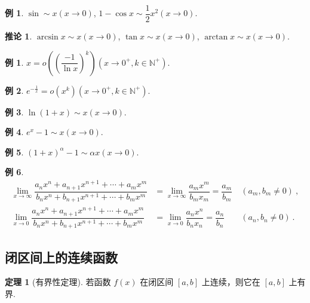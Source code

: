 \documentclass[zihao=-4,linespread=1.8,UTF8,nothm]{aytony_base}
\theoremstyle{definition}
\newtheorem{theorem}{\indent\heiti\textbf{定理}}[subsection]
\newtheorem*{corollary}{\indent\heiti\textbf{推论}}
\newtheorem{example}{\indent\heiti\textbf{例}}[subsection]
\newtheorem*{example*}{\indent\heiti\textbf{例}}
\begin{document}
\begin{example*}
    $\sin \sim x(x \to 0)$, $1 - \cos x \sim \dfrac{1}{2}x^2(x \to 0)$.
\end{example*}

\begin{corollary}
    $\arcsin x \sim x(x \to 0)$, $\tan x \sim x(x \to 0)$, $\arctan x \sim x(x \to 0)$.
\end{corollary}

\begin{example}
    $x = o\left(\left(\dfrac{-1}{\ln x}\right)^k\right)(x \to 0^+, k \in \mathbb{N}^+)$.
\end{example}

\begin{example}
    $e^{-\frac{1}{x}} = o(x^k)(x \to 0^+, k \in \mathbb{N}^+)$.
\end{example}

\begin{example}
    $\ln (1+x) \sim x(x \to 0)$.
\end{example}

\begin{example}
    $e^x - 1 \sim x(x \to 0)$.
\end{example}

\begin{example}
    $(1+x)^\alpha - 1 \sim \alpha x(x \to 0)$.
\end{example}

\setcounter{example}{7}
\begin{example}
    $$
        \begin{aligned}
            \lim\limits_{x \to \infty} \dfrac{a_nx^n + a_{n+1}x^{n+1} + \cdots + a_mx^m}{b_nx^n + b_{n+1}x^{n+1} + \cdots + b_mx^m} & = \lim\limits_{x \to \infty} \dfrac{a_mx^m}{b_mx_m}  = \dfrac{a_m}{b_m}\  & (a_m, b_m \neq 0)\ , \\
            \lim\limits_{x \to 0} \dfrac{a_nx^n + a_{n+1}x^{n+1} + \cdots + a_mx^m}{b_nx^n + b_{n+1}x^{n+1} + \cdots + b_mx^m}      & = \lim\limits_{x \to 0} \dfrac{a_nx^n}{b_nx_n} = \dfrac{a_n}{b_n}\        & (a_n, b_n \neq 0)\ .
        \end{aligned}
    $$
\end{example}

\subsection{闭区间上的连续函数}

\begin{theorem}[有界性定理]
    若函数 $f(x)$ 在闭区间 $[a, b]$ 上连续，则它在 $[a, b]$ 上有界.
\end{theorem}
\end{document}
